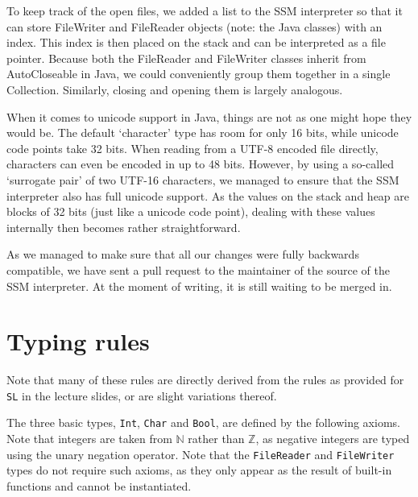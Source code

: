 \documentclass[a4paper]{article}
\begin{document}
To keep track of the open files, we added a list to the SSM interpreter so that it can store FileWriter and FileReader objects (note: the Java classes) with an index. This index is then placed on the stack and can be interpreted as a file pointer. Because both the FileReader and FileWriter classes inherit from AutoCloseable in Java, we could conveniently group them together in a single Collection. Similarly, closing and opening them is largely analogous.

When it comes to unicode support in Java, things are not as one might hope they would be. The default `character' type has room for only 16 bits, while unicode code points take 32 bits. When reading from a UTF-8 encoded file directly, characters can even be encoded in up to 48 bits. However, by using a so-called `surrogate pair' of two UTF-16 characters, we managed to ensure that the SSM interpreter also has full unicode support. As the values on the stack and heap are blocks of 32 bits (just like a unicode code point), dealing with these values internally then becomes rather straightforward.

As we managed to make sure that all our changes were fully backwards compatible, we have sent a pull request to the maintainer of the source of the SSM interpreter. At the moment of writing, it is still waiting to be merged in.

\section{Typing rules}

Note that many of these rules are directly derived from the rules as provided for {\tt SL} in the lecture slides, or are slight variations thereof.

The three basic types, {\tt Int}, {\tt Char} and {\tt Bool}, are defined by the following axioms. Note that integers are taken from $\mathbb{N}$ rather than $\mathbb{Z}$, as negative integers are typed using the unary negation operator. Note that the {\tt FileReader} and {\tt FileWriter} types do not require such axioms, as they only appear as the result of built-in functions and cannot be instantiated.

{\sf
\begin{prooftree}
\end{prooftree}
}

{\sf
\begin{prooftree}
\end{prooftree}
}
\end{document}
